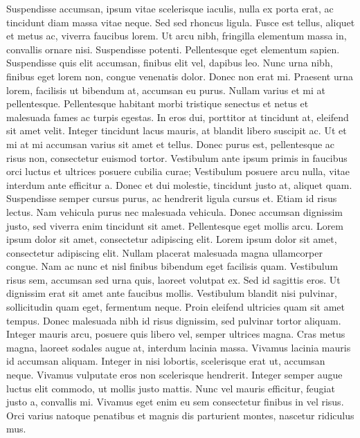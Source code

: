 Suspendisse accumsan, ipsum vitae scelerisque iaculis, nulla ex porta erat, ac tincidunt diam massa vitae neque. Sed sed rhoncus ligula. Fusce est tellus, aliquet et metus ac, viverra faucibus lorem. Ut arcu nibh, fringilla elementum massa in, convallis ornare nisi. Suspendisse potenti. Pellentesque eget elementum sapien. Suspendisse quis elit accumsan, finibus elit vel, dapibus leo. Nunc urna nibh, finibus eget lorem non, congue venenatis dolor. Donec non erat mi. Praesent urna lorem, facilisis ut bibendum at, accumsan eu purus. Nullam varius et mi at pellentesque.
Pellentesque habitant morbi tristique senectus et netus et malesuada fames ac turpis egestas. In eros dui, porttitor at tincidunt at, eleifend sit amet velit. Integer tincidunt lacus mauris, at blandit libero suscipit ac. Ut et mi at mi accumsan varius sit amet et tellus. Donec purus est, pellentesque ac risus non, consectetur euismod tortor. Vestibulum ante ipsum primis in faucibus orci luctus et ultrices posuere cubilia curae; Vestibulum posuere arcu nulla, vitae interdum ante efficitur a. Donec et dui molestie, tincidunt justo at, aliquet quam. Suspendisse semper cursus purus, ac hendrerit ligula cursus et.
Etiam id risus lectus. Nam vehicula purus nec malesuada vehicula. Donec accumsan dignissim justo, sed viverra enim tincidunt sit amet. Pellentesque eget mollis arcu. Lorem ipsum dolor sit amet, consectetur adipiscing elit. Lorem ipsum dolor sit amet, consectetur adipiscing elit. Nullam placerat malesuada magna ullamcorper congue. Nam ac nunc et nisl finibus bibendum eget facilisis quam. Vestibulum risus sem, accumsan sed urna quis, laoreet volutpat ex. Sed id sagittis eros. Ut dignissim erat sit amet ante faucibus mollis.
Vestibulum blandit nisi pulvinar, sollicitudin quam eget, fermentum neque. Proin eleifend ultricies quam sit amet tempus. Donec malesuada nibh id risus dignissim, sed pulvinar tortor aliquam. Integer mauris arcu, posuere quis libero vel, semper ultrices magna. Cras metus magna, laoreet sodales augue at, interdum lacinia massa. Vivamus lacinia mauris id accumsan aliquam. Integer in nisi lobortis, scelerisque erat ut, accumsan neque. Vivamus vulputate eros non scelerisque hendrerit. Integer semper augue luctus elit commodo, ut mollis justo mattis. Nunc vel mauris efficitur, feugiat justo a, convallis mi. Vivamus eget enim eu sem consectetur finibus in vel risus. Orci varius natoque penatibus et magnis dis parturient montes, nascetur ridiculus mus. 

